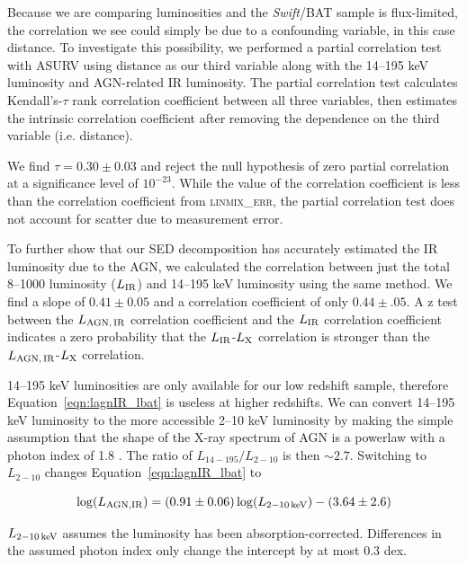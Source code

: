 \documentclass[fleqn, usenatbib]{mnras}
\newcommand{\swift}{\textit{Swift}}
\begin{document}
Because we are comparing luminosities and the \swift/BAT sample is flux-limited, the correlation we see could simply be due to a confounding variable, in this case distance. To investigate this possibility, we performed a partial correlation test with ASURV using distance as our third variable along with the 14--195 keV luminosity and AGN-related IR luminosity. The partial correlation test calculates Kendall's-$\tau$ rank correlation coefficient between all three variables, then estimates the intrinsic correlation coefficient after removing the dependence on the third variable (i.e. distance). 

We find $\tau = 0.30\pm0.03$ and reject the null hypothesis of zero partial correlation at a significance level of $10^{-23}$. While the value of the correlation coefficient is less than the correlation coefficient from \textsc{linmix\_err}, the partial correlation test does not account for scatter due to measurement error. 

To further show that our SED decomposition has accurately estimated the IR luminosity due to the AGN, we calculated the correlation between just the total 8--1000 \micron{} luminosity ($L_{\rm IR}$) and 14--195 keV luminosity using the same method. We find a slope of $0.41\pm0.05$ and a correlation coefficient of only $0.44\pm.05$. A z test between the $L_{\rm AGN,\,IR}$ correlation coefficient and the $L_{\rm IR}$ correlation coefficient indicates a zero probability that the $L_{\rm IR}$-$L_{\rm X}$ correlation is stronger than the $L_{\rm AGN,\,IR}$-$L_{\rm X}$ correlation. 

14--195 keV luminosities are only available for our low redshift sample, therefore Equation~\ref{eqn:lagnIR_lbat} is useless at higher redshifts. We can convert 14--195 keV luminosity to the more accessible 2--10 keV luminosity by making the simple assumption that the shape of the X-ray spectrum of AGN is a powerlaw with a photon index of 1.8 \citep[e.g.][]{Vasudevan:2013dz}. The ratio of $L_{14-195}/L_{2-10}$ is then $\sim2.7$. Switching to $L_{2-10}$ changes Equation~\ref{eqn:lagnIR_lbat} to 

\begin{equation}\label{eqn:lagnIR_2_10}
\log(L_{\rm AGN,IR}) =  (0.91\pm0.06)\log(L_{\rm 2-10\,keV}) - (3.64\pm2.6)
\end{equation}

\noindent $L_{\rm 2-10\,keV}$ assumes the luminosity has been absorption-corrected. Differences in the assumed photon index only change the intercept by at most 0.3 dex. 
\end{document}
